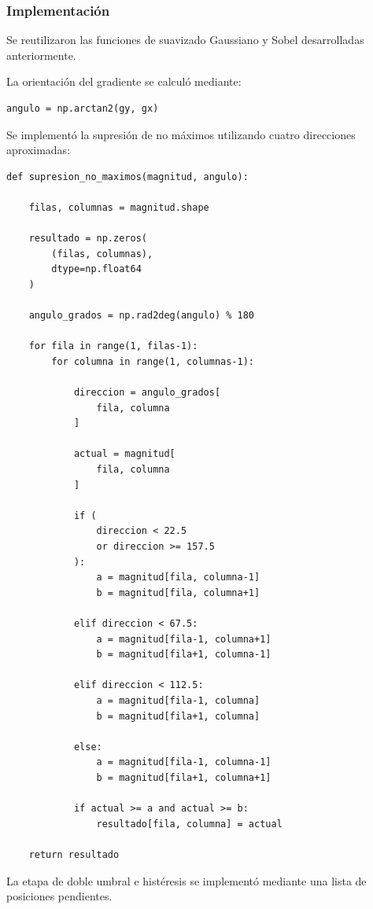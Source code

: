 \documentclass[11pt,letterpaper]{article}
\begin{document}
\subsubsection*{Implementación}

Se reutilizaron las funciones
de suavizado Gaussiano y Sobel
desarrolladas anteriormente.

La orientación del gradiente
se calculó mediante:

\begin{lstlisting}
angulo = np.arctan2(gy, gx)
\end{lstlisting}

Se implementó la supresión
de no máximos utilizando cuatro
direcciones aproximadas:

\begin{lstlisting}
def supresion_no_maximos(magnitud, angulo):

    filas, columnas = magnitud.shape

    resultado = np.zeros(
        (filas, columnas),
        dtype=np.float64
    )

    angulo_grados = np.rad2deg(angulo) % 180

    for fila in range(1, filas-1):
        for columna in range(1, columnas-1):

            direccion = angulo_grados[
                fila, columna
            ]

            actual = magnitud[
                fila, columna
            ]

            if (
                direccion < 22.5
                or direccion >= 157.5
            ):
                a = magnitud[fila, columna-1]
                b = magnitud[fila, columna+1]

            elif direccion < 67.5:
                a = magnitud[fila-1, columna+1]
                b = magnitud[fila+1, columna-1]

            elif direccion < 112.5:
                a = magnitud[fila-1, columna]
                b = magnitud[fila+1, columna]

            else:
                a = magnitud[fila-1, columna-1]
                b = magnitud[fila+1, columna+1]

            if actual >= a and actual >= b:
                resultado[fila, columna] = actual

    return resultado
\end{lstlisting}

La etapa de doble umbral e histéresis
se implementó mediante una lista
de posiciones pendientes.
\end{document}
